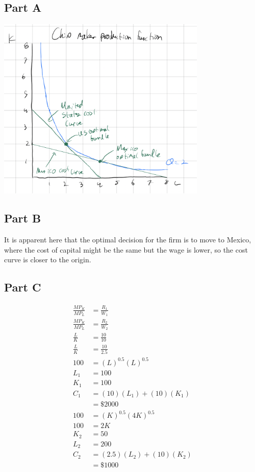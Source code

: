 \documentclass[8pt]{extarticle}
\begin{document}
{\subsection*{Part A}
\begin{center}
	\includegraphics[width=10cm]{HW6Q7A}
\end{center}
\subsection*{Part B}
It is apparent here that the optimal decision for the firm is to move to Mexico, where the cost of capital might be the same but the wage is lower, so the cost curve is closer to the origin.
\subsection*{Part C}
\begin{align*}
	\frac{MP_K}{MP_L} &= \frac{R_1}{W_1} \\
	\frac{MP_K}{MP_L} &= \frac{R_2}{W_2} \\
	\frac{L}{K} &= \frac{10}{10} \\
	\frac{L}{K} &= \frac{10}{2.5} \\
	100 &= (L)^{0.5}(L)^{0.5} \\
	L_1 &= 100 \\
	K_1 &= 100 \\
	C_1 &= (10)(L_1) + (10)(K_1) \\
	&= \boxed{\$2000} \\
	100 &= (K)^{0.5}(4K)^{0.5} \\
	100 &= 2K \\
	K_2 &= 50 \\
	L_2 &= 200 \\
	C_2 &= (2.5)(L_2) + (10)(K_2) \\
	&= \boxed{\$1000} 
\end{align*}
}
\end{document}

